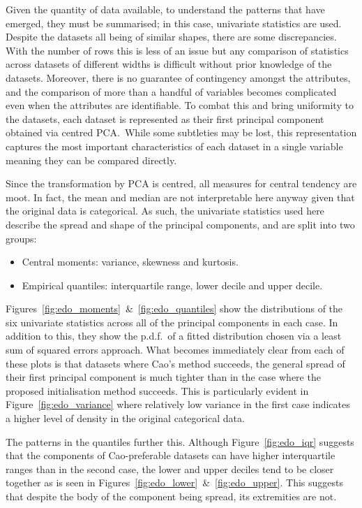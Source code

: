 Given the quantity of data available, to understand the patterns that have
emerged, they must be summarised; in this case, univariate statistics are used.
Despite the datasets all being of similar shapes, there are some discrepancies.
With the number of rows this is less of an issue but any comparison of
statistics across datasets of different widths is difficult without prior
knowledge of the datasets. Moreover, there is no guarantee of contingency
amongst the attributes, and the comparison of more than a handful of variables
becomes complicated even when the attributes are identifiable. To combat this
and bring uniformity to the datasets, each dataset is represented as their first
principal component obtained via centred PCA.\ While some subtleties may be
lost, this representation captures the most important characteristics of each
dataset in a single variable meaning they can be compared directly.

Since the transformation by PCA is centred, all measures for central tendency
are moot. In fact, the mean and median are not interpretable here anyway given
that the original data is categorical. As such, the univariate statistics used
here describe the spread and shape of the principal components, and are split
into two groups:
\begin{itemize}
    \item Central moments: variance, skewness and kurtosis.
    \item Empirical quantiles: interquartile range, lower decile and upper
        decile.
\end{itemize}

Figures~\ref{fig:edo_moments}~\&~\ref{fig:edo_quantiles} show the distributions
of the six univariate statistics across all of the principal components in each
case.  In addition to this, they show the p.d.f.\ of a fitted distribution
chosen via a least sum of squared errors approach. What becomes immediately
clear from each of these plots is that datasets where Cao's method succeeds, the
general spread of their first principal component is much tighter than in the
case where the proposed initialisation method succeeds. This is particularly
evident in Figure~\ref{fig:edo_variance} where relatively low variance in the
first case indicates a higher level of density in the original categorical data.

The patterns in the quantiles further this. Although Figure~\ref{fig:edo_iqr}
suggests that the components of Cao-preferable datasets can have higher
interquartile ranges than in the second case, the lower and upper deciles tend
to be closer together as is seen in
Figures~\ref{fig:edo_lower}~\&~\ref{fig:edo_upper}. This suggests that despite
the body of the component being spread, its extremities are not.

